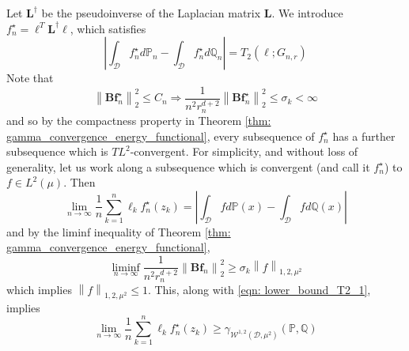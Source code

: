 \documentclass{article}
\newcommand{\norm}[1]{\left\lVert#1\right\rVert}
\newcommand{\abs}[1]{\left \lvert #1 \right \rvert}
\newcommand{\Lbf}{\mathbf{L}}
\newcommand{\Bbf}{\mathbf{B}}
\newcommand{\lbf}{\bm{\ell}}
\newcommand{\fbf}{\mathbf{f}}
\newcommand{\Dset}{\mathcal{D}}
\newcommand{\Wset}{\mathcal{W}}
\newcommand{\Pbb}{\mathbb{P}}
\newcommand{\Qbb}{\mathbb{Q}}
\newcommand{\1}{\mathbf{1}}
\theoremstyle{alden}
\theoremstyle{aldenthm}
\theoremstyle{remark}
\begin{document}
Let $\Lbf^{\dagger}$ be the pseudoinverse of the Laplacian matrix $\Lbf$. We introduce $f_n^{\star} = \lbf^T \Lbf^{\dagger} \lbf$, which satisfies
\begin{equation*}
\abs{\int_{\Dset}f_n^{\star}d\Pbb_n - \int_{\Dset}f_n^{\star}d\Qbb_n} = T_2(\lbf; G_{n,r})
\end{equation*}
Note that
\begin{equation*}
\norm{\Bbf \fbf_n^{\star}}_2^2 \leq C_n \Longrightarrow \frac{1}{n^2 r_n^{d+2}} \norm{\Bbf \fbf_n^{\star}}_2^2  \leq \sigma_k < \infty
\end{equation*}
and so by the compactness property in Theorem \ref{thm: gamma_convergence_energy_functional}, every subsequence of $f_n^{\star}$ has a further subsequence which is $TL^2$-convergent. For simplicity, and without loss of generality, let us work along a subsequence which is convergent (and call it $f_n^{\star}$) to $f \in L^2(\mu)$. Then
\begin{equation}
\label{eqn: lower_bound_T2_1}
\lim_{n \to \infty} \frac{1}{n} \sum_{k = 1}^{n} \ell_k f_n^{\star}(z_k) = \abs{\int_{\Dset}f d\Pbb(x) - \int_{\Dset}f d\Qbb(x)}
\end{equation}
and by the liminf inequality of Theorem \ref{thm: gamma_convergence_energy_functional},
\begin{equation*}
\liminf_{n \to \infty} \frac{1}{n^2 r_n^{d+2}} \norm{\Bbf \fbf_n}_2^2 \geq \sigma_k \norm{f}_{1,2,\mu^2}
\end{equation*}
which implies $\norm{f}_{1,2,\mu^2} \leq 1$. This, along with \eqref{eqn: lower_bound_T2_1}, implies
\begin{equation*}
\lim_{n \to \infty} \frac{1}{n} \sum_{k = 1}^{n} \ell_k f_n^{\star}(z_k) \geq \gamma_{\Wset^{1,2}(\Dset,\mu^2)}(\Pbb,\Qbb)
\end{equation*}

\clearpage



\end{document}
